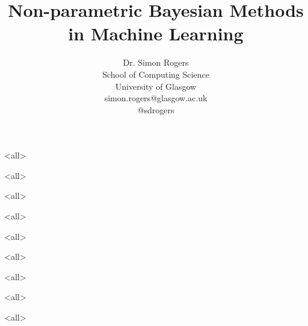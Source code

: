 \documentclass{beamer}
\title{Non-parametric Bayesian Methods in Machine Learning}
\author{Dr. Simon Rogers\\School of Computing Science\\University of Glasgow\\simon.rogers@glasgow.ac.uk\\@sdrogers}
\begin{document}
\mode<all>

\begin{frame}
	\titlepage
\end{frame}

\mode<all>



\mode<all>



\mode<all>



\mode<all>


\mode<all>


\mode<all>


\mode<all>


\mode<all>

\end{document}
